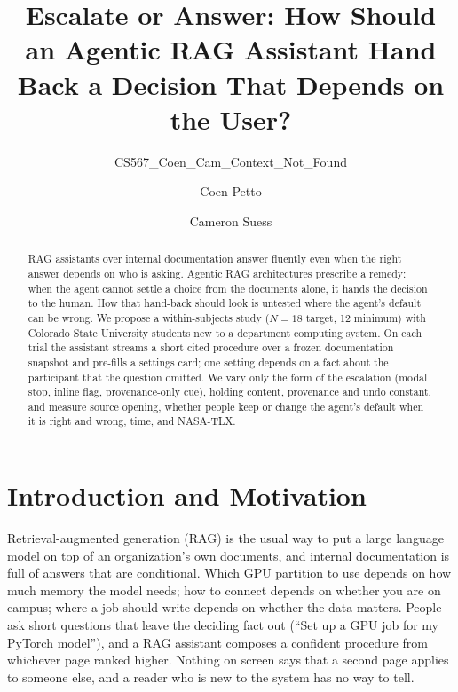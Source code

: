 \documentclass[sigconf,nonacm]{acmart}
\begin{document}
\title{Escalate or Answer: How Should an Agentic RAG Assistant Hand Back a Decision That Depends on the User?}
\subtitle{CS567\_Coen\_Cam\_Context\_Not\_Found}

\author{Coen Petto}
\author{Cameron Suess}

\renewcommand{\shortauthors}{Petto and Suess}

\begin{abstract}
RAG assistants over internal documentation answer fluently even when the
right answer depends on who is asking. Agentic RAG architectures prescribe
a remedy: when the agent cannot settle a choice from the documents alone,
it hands the decision to the human. How that hand-back should look is
untested where the agent's default can be wrong. We propose a
within-subjects study ($N{=}18$ target, 12 minimum) with Colorado State
University students new to a department computing system. On each trial
the assistant streams a short cited procedure over a frozen documentation
snapshot and pre-fills a settings card; one setting depends on a fact about
the participant that the question omitted. We vary only the form of the
escalation (modal stop, inline flag, provenance-only cue), holding content,
provenance and undo constant, and measure source opening, whether people
keep or change the agent's default when it is right and wrong, time, and
NASA-TLX.
\end{abstract}


\maketitle

\section{Introduction and Motivation}
\label{sec:intro}

Retrieval-augmented generation (RAG) is the usual way to put a large
language model on top of an organization's own documents, and internal
documentation is full of answers that are conditional. Which GPU partition
to use depends on how much memory the model needs; how to connect depends
on whether you are on campus; where a job should write depends on whether
the data matters. People ask short questions that leave the deciding fact
out (``Set up a GPU job for my PyTorch model''), and a RAG assistant
composes a confident procedure from whichever page ranked higher. Nothing
on screen says that a second page applies to someone else, and a reader
who is new to the system has no way to tell.
\end{document}
